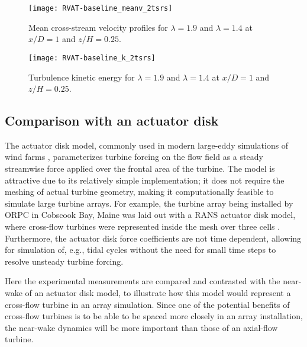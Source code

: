 \begin{figure}
    \centering
    
    \texttt{[image: RVAT-baseline\_meanv\_2tsrs]}

    \caption{Mean cross-stream velocity profiles for $\lambda = 1.9$ and
        $\lambda=1.4$ at $x/D=1$ and $z/H = 0.25$.}

    \label{fig:RVAT-baseline-meanv-2tsrs} 
\end{figure}

\begin{figure}
    \centering
    
    \texttt{[image: RVAT-baseline\_k\_2tsrs]}

    \caption{Turbulence kinetic energy for $\lambda = 1.9$ and
        $\lambda=1.4$ at $x/D=1$ and $z/H = 0.25$.}

    \label{fig:RVAT-baseline-k-2tsrs} 
\end{figure}


\subsection{Comparison with an actuator disk}

The actuator disk model, commonly used in modern large-eddy simulations of wind
farms \cite{Stevens2014}, parameterizes turbine forcing on the flow field as a
steady streamwise force applied over the frontal area of the turbine. The model
is attractive due to its relatively simple implementation; it does not require
the meshing of actual turbine geometry, making it computationally feasible to
simulate large turbine arrays. For example, the turbine array being installed by
ORPC in Cobscook Bay, Maine was laid out with a RANS actuator disk model, where
cross-flow turbines were represented inside the mesh over three cells
\cite{Nelson2013}. Furthermore, the actuator disk force coefficients are not
time dependent, allowing for simulation of, e.g., tidal cycles without the need
for small time steps to resolve unsteady turbine forcing.

Here the experimental measurements are compared and contrasted with the
near-wake of an actuator disk model, to illustrate how this model would
represent a cross-flow turbine in an array simulation. Since one of the
potential benefits of cross-flow turbines is to be able to be spaced more
closely in an array installation, the near-wake dynamics will be more important
than those of an axial-flow turbine.

